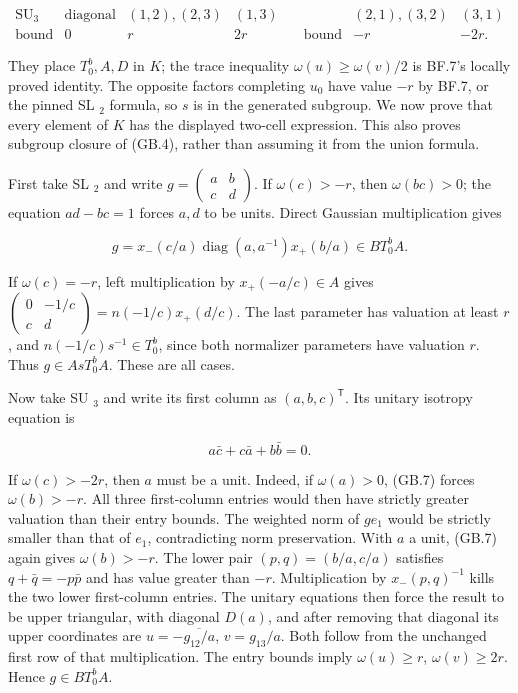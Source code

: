 \documentclass[
  11pt,
]{article}
\begin{document}
\[
 \begin{array}{c|ccc}
 \operatorname{SU}_3&\text{diagonal}&(1,2),(2,3)&(1,3)\\
 \text{bound}&0&r&2r
 \end{array}
 \quad
 \begin{array}{c|cc}
 &(2,1),(3,2)&(3,1)\\
 \text{bound}&-r&-2r.
 \end{array}
 \tag{GB.5}
\]

They place \(T_0^b,A,D\) in \(K\); the trace inequality
\(\omega(u)\ge\omega(v)/2\) is BF.7's locally proved identity. The
opposite factors completing \(u_0\) have value \(-r\) by BF.7, or the
pinned SL \(_2\) formula, so \(s\) is in the generated subgroup. We now
prove that every element of \(K\) has the displayed two-cell expression.
This also proves subgroup closure of (GB.4), rather than assuming it
from the union formula.

First take SL \(_2\) and write
\(g=\begin{pmatrix}a&b\\c&d\end{pmatrix}\). If \(\omega(c)>-r\), then
\(\omega(bc)>0\); the equation \(ad-bc=1\) forces \(a,d\) to be units.
Direct Gaussian multiplication gives

\[
 g=x_-(c/a)\operatorname{diag}(a,a^{-1})x_+(b/a)\in B T_0^b A.
 \tag{GB.6}
\]

If \(\omega(c)=-r\), left multiplication by \(x_+(-a/c)\in A\) gives
\(\begin{pmatrix}0&-1/c\\c&d\end{pmatrix}=n(-1/c)x_+(d/c)\). The last
parameter has valuation at least \(r\), and \(n(-1/c)s^{-1}\in T_0^b\),
since both normalizer parameters have valuation \(r\). Thus
\(g\in A sT_0^b A\). These are all cases.

Now take SU \(_3\) and write its first column as
\((a,b,c)^{\mathsf T}\). Its unitary isotropy equation is

\[
 a\bar c+c\bar a+b\bar b=0.
 \tag{GB.7}
\]

If \(\omega(c)>-2r\), then \(a\) must be a unit. Indeed, if
\(\omega(a)>0\), (GB.7) forces \(\omega(b)>-r\). All three first-column
entries would then have strictly greater valuation than their entry
bounds. The weighted norm of \(ge_1\) would be strictly smaller than
that of \(e_1\), contradicting norm preservation. With \(a\) a unit,
(GB.7) again gives \(\omega(b)>-r\). The lower pair \((p,q)=(b/a,c/a)\)
satisfies \(q+\bar q=-p\bar p\) and has value greater than \(-r\).
Multiplication by \(x_-(p,q)^{-1}\) kills the two lower first-column
entries. The unitary equations then force the result to be upper
triangular, with diagonal \(D(a)\), and after removing that diagonal its
upper coordinates are \(u=-\overline{g_{12}/a}\), \(v=g_{13}/a\). Both
follow from the unchanged first row of that multiplication. The entry
bounds imply \(\omega(u)\ge r\), \(\omega(v)\ge2r\). Hence
\(g\in B T_0^b A\).
\end{document}
